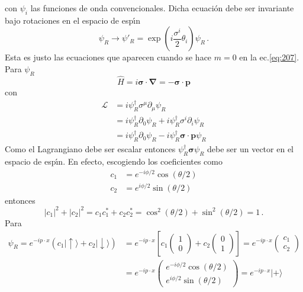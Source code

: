 con $\psi_i$ las funciones de onda convencionales. Dicha ecuaci\'on debe ser invariante bajo rotaciones en el espacio de esp\'\i n
\begin{equation}
  \psi_R\to\psi'_R=\exp(i\frac{\sigma^i}{2}\theta_i)\psi_R\,.
\end{equation}
Esta es justo las ecuaciones que aparecen cuando se hace $m=0$ en la ec.\eqref{eq:207}. Para $\psi_R$
\begin{equation}
  \widehat{H}=i\boldsymbol{\sigma}\cdot\boldsymbol{\nabla}=-\boldsymbol{\sigma}\cdot\mathbf{p}
\end{equation}
con
\begin{align}
\label{eq:208}
\mathcal{L}&= i\psi_R^\dagger {\sigma}^\mu\partial_\mu\psi_R  \nonumber\\
&=i\psi_R^\dagger \partial_0\psi_R+i\psi_R^\dagger {\sigma}^i\partial_i\psi_R\nonumber\\
&=i\psi_R^\dagger \partial_0\psi_R-i\psi_R^\dagger\boldsymbol{\sigma}\cdot\mathbf{p} \psi_R
\end{align}
Como el Lagrangiano debe ser escalar entonces $\psi_R^\dagger\boldsymbol{\sigma} \psi_R$ debe ser un vector en el espacio de esp\'\i n. En efecto, escogiendo los coeficientes como
\begin{align}
  c_1&=e^{-i \phi/2}\cos(\theta/2)\nonumber\\
  c_2&=e^{i \phi/2}\sin(\theta/2)
\end{align}
entonces
\begin{equation}
  |c_1|^2+|c_2|^2=c_1 c_1^*+c_2 c_2^*=\cos^2(\theta/2)+\sin^2(\theta/2)=1\,.
\end{equation}
Para
\begin{align}
  \psi_R=e^{-i p\cdot x}(c_1|\uparrow\rangle+c_2|\downarrow\rangle)&=e^{-i p\cdot x}\left[c_1\begin{pmatrix}
    1\\
    0
  \end{pmatrix}+c_2
  \begin{pmatrix}
    0\\
    1
  \end{pmatrix}\right]=
  e^{-i p\cdot x}\begin{pmatrix}
    c_1\\
    c_2
  \end{pmatrix}\,\nonumber\\
  &=e^{-i p\cdot x}
  \begin{pmatrix}
  e^{-i \phi/2}\cos(\theta/2)\\
  e^{i \phi/2}\sin(\theta/2)
  \end{pmatrix}=e^{-i p\cdot x}|+\rangle
\end{align}
